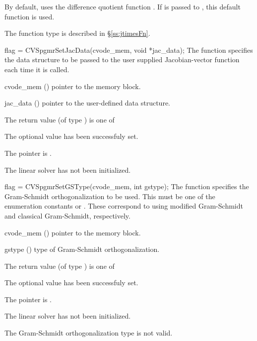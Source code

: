 {
  By default, {\cvspgmr} uses the difference quotient function .
  If  is passed to , this default function is used.

  The function type  is described in \S\ref{ss:jtimesFn}.
}
{
  flag = CVSpgmrSetJacData(cvode\_mem, void *jac\_data);
}
{
  The function  specifies the data structure
  to be passed to the user supplied Jacobian-vector
  function each time it is called.
}
{
  \begin{args}
  \item[cvode\_mem] ()
    pointer to the {\cvode} memory block.
  \item[jac\_data] ()
     pointer to the user-defined data structure.
  \end{args}
}
{
  The return value  (of type ) is one of
  \begin{args}
  \item[\Id{SUCCESS}] 
    The optional value has been successfuly set.
  \item[\Id{LIN\_NO\_MEM}]
    The  pointer is .
  \item[\Id{LIN\_NO\_LMEM}]
    The {\cvspgmr} linear solver has not been initialized.
  \end{args}
}
{}
{
  flag = CVSpgmrSetGSType(cvode\_mem, int gstype);
}
{
  The function  specifies the 
  Gram-Schmidt orthogonalization to be used. 
  This must be one of the enumeration constants 
  or . These correspond to using modified Gram-Schmidt 
  and classical Gram-Schmidt, respectively. 
}
{
  \begin{args}
  \item[cvode\_mem] ()
    pointer to the {\cvode} memory block.
  \item[gstype] ()
    type of Gram-Schmidt orthogonalization.
  \end{args}
}
{
  The return value  (of type ) is one of
  \begin{args}
  \item[\Id{SUCCESS}] 
    The optional value has been successfuly set.
  \item[\Id{LIN\_NO\_MEM}]
    The  pointer is .
  \item[\Id{LIN\_NO\_LMEM}]
    The {\cvspgmr} linear solver has not been initialized.
  \item[\Id{LIN\_ILL\_INPUT}]
    The Gram-Schmidt orthogonalization type  is not valid.
  \end{args}
}
